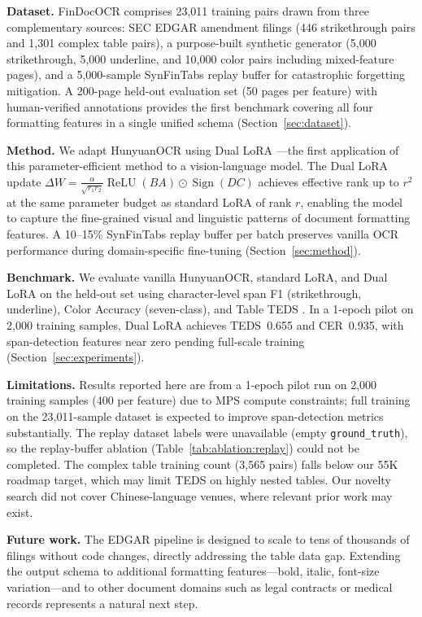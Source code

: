 \documentclass[10pt,twocolumn]{article}
\begin{document}
\textbf{Dataset.} FinDocOCR comprises 23{,}011 training pairs drawn from three
complementary sources: SEC EDGAR amendment filings (446 strikethrough pairs and
1{,}301 complex table pairs), a purpose-built synthetic generator (5{,}000
strikethrough, 5{,}000 underline, and 10{,}000 color pairs including mixed-feature
pages), and a 5{,}000-sample SynFinTabs replay buffer for catastrophic forgetting
mitigation. A 200-page held-out evaluation set (50 pages per feature) with
human-verified annotations provides the first benchmark covering all four
formatting features in a single unified schema
(Section~\ref{sec:dataset}).

\textbf{Method.} We adapt HunyuanOCR \cite{hunyuanocr2025} using Dual LoRA
\cite{xu2025duallora}---the first application of this parameter-efficient method
to a vision-language model. The Dual LoRA update
$\Delta W = \frac{\alpha}{\sqrt{r_1 r_2}}\operatorname{ReLU}(BA) \odot
\operatorname{Sign}(DC)$ achieves effective rank up to $r^2$ at the same
parameter budget as standard LoRA of rank $r$, enabling the model to capture the
fine-grained visual and linguistic patterns of document formatting features. A
10--15\% SynFinTabs replay buffer per batch preserves vanilla OCR performance
during domain-specific fine-tuning (Section~\ref{sec:method}).

\textbf{Benchmark.} We evaluate vanilla HunyuanOCR, standard LoRA, and Dual
LoRA on the held-out set using character-level span F1 (strikethrough, underline),
Color Accuracy (seven-class), and Table TEDS \cite{zhong2020teds}. In a 1-epoch
pilot on 2{,}000 training samples, Dual LoRA achieves TEDS~0.655 and CER~0.935,
with span-detection features near zero pending full-scale training
(Section~\ref{sec:experiments}).

\textbf{Limitations.} Results reported here are from a 1-epoch pilot run on
2{,}000 training samples (400 per feature) due to MPS compute constraints; full
training on the 23{,}011-sample dataset is expected to improve span-detection
metrics substantially. The replay dataset labels were unavailable (empty
\texttt{ground\_truth}), so the replay-buffer ablation (Table~\ref{tab:ablation:replay})
could not be completed. The complex table training count (3{,}565 pairs) falls
below our 55K roadmap target, which may limit TEDS on highly nested tables.
Our novelty search did not cover Chinese-language venues, where relevant prior
work may exist.

\textbf{Future work.} The EDGAR pipeline is designed to scale to tens of
thousands of filings without code changes, directly addressing the table data
gap. Extending the output schema to additional formatting features---bold, italic,
font-size variation---and to other document domains such as legal contracts or
medical records represents a natural next step.



\end{document}
